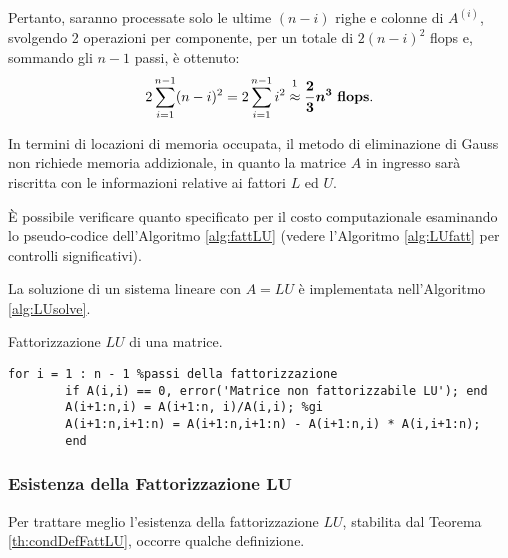 Pertanto, saranno processate solo le ultime $(n-i)$ righe e colonne di $A^{(i)}$, svolgendo 2 operazioni per componente, per un totale di $2(n-i)^2$ flops e, sommando gli $n-1$ passi, è ottenuto:
\begin{equation}\label{eq:costo_fattorizzazione_LU}
	2\sum_{i=1}^{n-1}(n-i)^2=2\sum_{i=1}^{n-1}i^2\overset{\footnotemark}{\approx}\boldsymbol{\frac{2}{3}n^3}\text{ \textbf{flops}.}
\end{equation}

In termini di locazioni di memoria occupata, il metodo di eliminazione di Gauss non richiede memoria addizionale, in quanto la matrice $A$ in ingresso sarà riscritta con le informazioni relative ai fattori $L$ ed $U$.

È possibile verificare quanto specificato per il costo computazionale esaminando lo pseudo-codice dell'Algoritmo \ref{alg:fattLU} (vedere l'Algoritmo \ref{alg:LUfatt} per controlli significativi).

La soluzione di un sistema lineare con $A=LU$ è implementata nell'Algoritmo \ref{alg:LUsolve}.
\begin{algorithm}
	\caption{Fattorizzazione $LU$ di una matrice.}
	\label{alg:fattLU}
	\begin{lstlisting}[style=Matlab-editor]
		for i = 1 : n - 1 %passi della fattorizzazione
		if A(i,i) == 0, error('Matrice non fattorizzabile LU'); end
		A(i+1:n,i) = A(i+1:n, i)/A(i,i); %gi
		A(i+1:n,i+1:n) = A(i+1:n,i+1:n) - A(i+1:n,i) * A(i,i+1:n);
		end
	\end{lstlisting}
\end{algorithm}

\subsubsection{Esistenza della Fattorizzazione \texorpdfstring{$\boldsymbol{LU}$}{LU}}
Per trattare meglio l'esistenza della fattorizzazione $LU$, stabilita dal Teorema \ref{th:condDefFattLU}, occorre qualche definizione.


